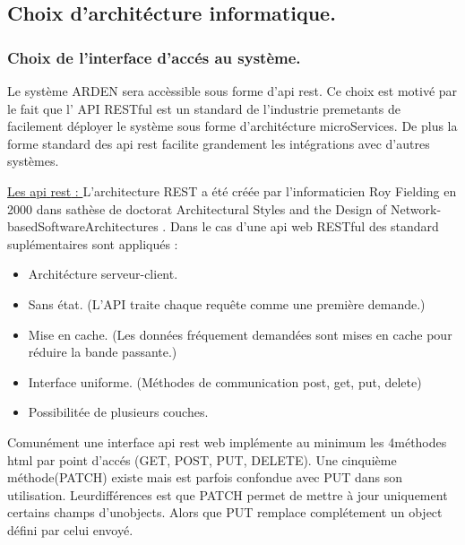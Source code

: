 \justify
\subsection{Choix d'architécture informatique.}

\subsubsection{Choix de l'interface d'accés au système.}

Le système ARDEN sera accèssible sous forme d'\gls{api} \gls{rest}. Ce choix est motivé par le fait que l' API RESTful est un standard de l'industrie premetants de facilement déployer le système sous forme d'architécture microServices. De plus la forme standard des \gls{api} \gls{rest} facilite grandement les intégrations avec d'autres systèmes.

\begin{minipage}{0.90\textwidth}
    \underline{
        Les \gls{api} \gls{rest} :
    }
    L'architecture REST a été créée par l'informaticien Roy Fielding en 2000 dans sathèse de doctorat Architectural Styles and the Design of Network-basedSoftwareArchitectures . \cite{REST_theses}
    Dans le cas d'une \gls{api} web RESTful des standard suplémentaires sont appliqués :
    \begin{itemize}
        \item Architécture serveur-client.
        \item Sans état. (L’API traite chaque requête comme une première demande.)
        \item Mise en cache. (Les données fréquement demandées sont mises en cache pour réduire la bande passante.)
        \item Interface uniforme. (Méthodes de communication post, get, put, delete)
        \item Possibilitée de plusieurs couches.
    \end{itemize}
    Comunément une interface \gls{api} \gls{rest} web implémente au minimum les 4méthodes html par point d'accés (GET, POST, PUT, DELETE). Une cinquième méthode(PATCH) existe mais est parfois confondue avec PUT dans son utilisation. Leurdifférences est que PATCH permet de mettre à jour uniquement certains champs d'unobjects. Alors que PUT remplace complétement un object défini par celui envoyé.
\end{minipage}


